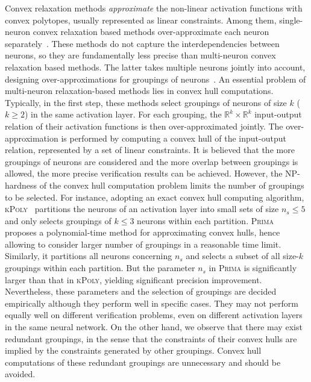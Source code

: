 \documentclass[runningheads]{llncs}
\newcommand{\prima}{\textsc{Prima}\xspace}
\newcommand{\krelu}{\textsc{kPoly}\xspace}
\newcommand{\real}{\mathbb{R}}
\begin{document}
Convex relaxation methods \emph{approximate} the non-linear activation functions
with convex polytopes, usually represented as linear constraints.
Among them, single-neuron convex relaxation based methods over-approximate
each neuron separately~\cite{NEURIPS2018_f2f44698,DBLP:journals/pacmpl/SinghGPV19,DBLP:conf/nips/ZhangWCHD18,DBLP:conf/iclr/XuZ0WJLH21,Zheng2022}.
These methods do not capture the interdependencies between neurons,
so they are fundamentally less precise than multi-neuron convex relaxation
based methods.
The latter takes multiple neurons jointly into account,
designing over-approximations for groupings of neurons~\cite{DBLP:conf/nips/SinghGPV19,DBLP:conf/nips/TjandraatmadjaA20,DBLP:journals/pacmpl/MullerMSPV22}.
An essential problem of multi-neuron relaxation-based methods lies in
convex hull computations. Typically, in the first step, these
methods select groupings of neurons of size $k$ ($k\ge 2$) in the same
activation layer. For each grouping, the $\real^k\times \real^k$
input-output relation of their activation functions is then
over-approximated jointly. The over-approximation is performed by
computing a convex hull of the input-output relation, represented by a
set of linear constraints. It is believed that the more groupings of
neurons are considered and the more overlap between groupings is allowed,
the more precise verification results can be achieved. However, the
NP-hardness of the convex hull computation problem limits the number of
groupings to be selected. For instance, adopting an exact convex hull
computing algorithm, \krelu~\cite{DBLP:conf/nips/SinghGPV19}
partitions the neurons of an activation layer into small sets of size
$n_s \le 5$ and only selects groupings of $k\le 3$ neurons within each
partition. \prima~\cite{DBLP:journals/pacmpl/MullerMSPV22} proposes a
polynomial-time method for approximating convex hulls, hence allowing
to consider larger number of groupings in a reasonable time
limit. Similarly, it partitions all neurons concerning $n_s$ and
selects a subset of all size-$k$ groupings within each partition. But the
parameter $n_s$ in \prima is significantly larger than that in \krelu,
yielding significant precision improvement. Nevertheless, these
parameters and the selection of groupings are decided empirically 
although they perform well in specific cases. They
may not perform equally well on different verification problems, even
on different activation layers in the same neural network. On the
other hand, we observe that there may exist redundant groupings, in the
sense that the constraints of their convex hulls are implied by the
constraints generated by other groupings. Convex hull computations of
these redundant groupings are unnecessary and should be avoided.
\end{document}
